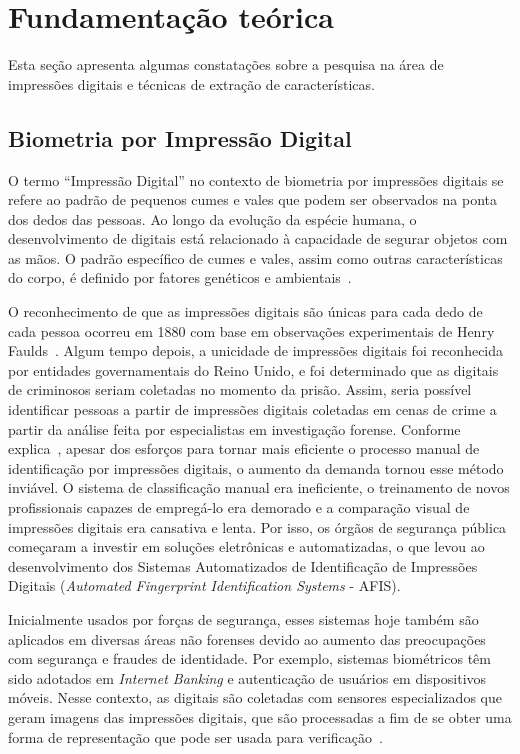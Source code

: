 \section{Fundamentação teórica}\label{sec:fundamentacao_teorica}

Esta seção apresenta algumas constatações sobre a pesquisa na área de impressões digitais e técnicas de extração de características.

\subsection{Biometria por Impressão Digital}\label{subsec:impressoes_digitais}

O termo ``Impressão Digital'' no contexto de biometria por impressões digitais se refere ao padrão de pequenos cumes e vales que podem ser observados na ponta dos dedos das pessoas. Ao longo da evolução da espécie humana, o desenvolvimento de digitais está relacionado à capacidade de segurar objetos com as mãos. O padrão específico de cumes e vales, assim como outras características do corpo, é definido por fatores genéticos e ambientais~\cite{handbook_of_fp_recognition}.

O reconhecimento de que as impressões digitais são únicas para cada dedo de cada pessoa ocorreu em 1880 com base em observações experimentais de Henry Faulds~\cite{FingerPrintTechniques}. Algum tempo depois, a unicidade de impressões digitais foi reconhecida por entidades governamentais do Reino Unido, e foi determinado que as digitais de criminosos seriam coletadas no momento da prisão. Assim, seria possível identificar pessoas a partir de impressões digitais coletadas em cenas de crime a partir da análise feita por especialistas em investigação forense. Conforme explica~, apesar dos esforços para tornar mais eficiente o processo manual de identificação por impressões digitais, o aumento da demanda tornou esse método inviável. O sistema de classificação manual era ineficiente, o treinamento de novos profissionais capazes de empregá-lo era demorado e a comparação visual de impressões digitais era cansativa e lenta. Por isso, os órgãos de segurança pública começaram a investir em soluções eletrônicas e automatizadas, o que levou ao desenvolvimento dos Sistemas Automatizados de Identificação de Impressões Digitais (\textit{Automated Fingerprint Identification Systems} - AFIS).

Inicialmente usados por forças de segurança, esses sistemas hoje também são aplicados em diversas áreas não forenses devido ao aumento das preocupações com segurança e fraudes de identidade. Por exemplo, sistemas biométricos têm sido adotados em \textit{Internet Banking} e autenticação de usuários em dispositivos móveis. Nesse contexto, as digitais são coletadas com sensores especializados que geram imagens das impressões digitais, que são processadas a fim de se obter uma forma de representação que pode ser usada para verificação~\cite{handbook_of_fp_recognition}.


